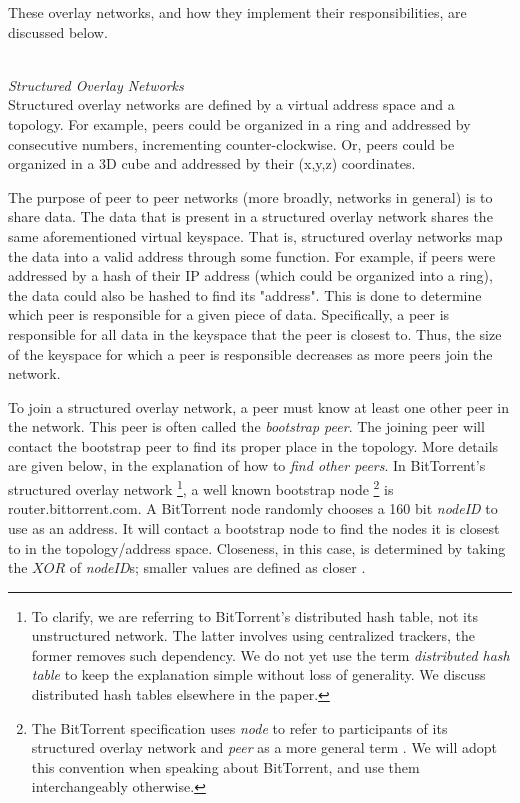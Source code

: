 \documentclass[12pt]{report}
\begin{document}
These overlay networks, and how they implement their responsibilities, are discussed below.

\hfill \\
\textit{Structured Overlay Networks}
\hfill \\

Structured overlay networks are defined by a virtual address space and a topology. For example, peers could be organized in a ring and addressed by consecutive numbers, incrementing counter-clockwise. Or, peers could be organized in a 3D cube and addressed by their (x,y,z) coordinates.

The purpose of peer to peer networks (more broadly, networks in general) is to share data. The data that is present in a structured overlay network shares the same aforementioned virtual keyspace. That is, structured overlay networks map the data into a valid address through some function. For example, if peers were addressed by a hash of their IP address (which could be organized into a ring), the data could also be hashed to find its "address". This is done to determine which peer is responsible for a given piece of data. Specifically, a peer is responsible for all data in the keyspace that the peer is closest to. Thus, the size of the keyspace for which a peer is responsible decreases as more peers join the network.

To join a structured overlay network, a peer must know at least one other peer in the network. This peer is often called the \textit{bootstrap peer}. The joining peer will contact the bootstrap peer to find its proper place in the topology. More details are given below, in the explanation of how to \textit{find other peers}. In BitTorrent's structured overlay network \footnote{To clarify, we are referring to BitTorrent's distributed hash table, not its unstructured network. The latter involves using centralized trackers, the former removes such dependency. We do not yet use the term \textit{distributed hash table} to keep the explanation simple without loss of generality. We discuss distributed hash tables elsewhere in the paper.}, a well known bootstrap node \footnote{The BitTorrent specification uses \textit{node} to refer to participants of its structured overlay network and \textit{peer} as a more general term \cite{bittorrentDHT}. We will adopt this convention when speaking about BitTorrent, and use them interchangeably otherwise.} is router.bittorrent.com. A BitTorrent node randomly chooses a 160 bit \textit{nodeID} to use as an address. It will contact a bootstrap node to find the nodes it is closest to in the topology/address space. Closeness, in this case, is determined by taking the $XOR$ of \textit{nodeID}s; smaller values are defined as closer \cite{bittorrentDHT}.
\end{document}
